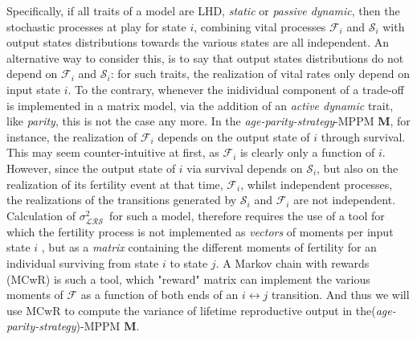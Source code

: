 \documentclass[10pt,a4paper]{article}
\newcommand{\M}{$\mathbf{M}$}
\newcommand{\PCoR}{\emph{individual} costs}
\newcommand{\vLRO}{$\sigma_{\mathrm{\mathcal{LRS}}}^2$}
\begin{document}
Specifically, if all traits of a model are LHD, \emph{static} or \emph{passive dynamic}, then the stochastic processes at play for state $i$, combining vital processes $\mathcal{F}_{i}$ and $\mathcal{S}_{i}$ with output states distributions towards the various states %
 are all independent. An alternative way to consider this, is to say that output states distributions do not depend on $\mathcal{F}_{i}$ and $\mathcal{S}_{i}$: for such traits, the realization of vital rates only depend on input state $i$.
To the contrary, whenever the inidividual component of a trade-off is implemented in a matrix model, via the addition of an \emph{active dynamic} trait, like \emph{parity}, this is not the case any more. In the \emph{age-parity-strategy}-MPPM \M, for instance, the realization of $\mathcal{F}_{i}$  depends on the output state of $i$ through survival. This may seem counter-intuitive at first, as $\mathcal{F}_{i}$ is clearly only a function of $i$. However, since the output state of $i$ via survival depends on $\mathcal{S}_{i}$, but also on the realization of its fertility event at that time, $\mathcal{F}_{i}$, whilst independent processes, the realizations of the transitions generated by $\mathcal{S}_{i}$ and $\mathcal{F}_{i}$ are not independent.\\
 
Calculation of \vLRO\ for such a model, therefore requires the use of a tool for which the fertility process is not implemented as \emph{vectors} of moments per input state $i$%
, but as a \emph{matrix} containing the different moments of fertility for an individual surviving from state $i$ to state $j$.
A Markov chain with rewards (MCwR) is such a tool, which "reward" matrix can implement the various moments of $\mathcal{F}$ as a function of both ends of an $i \leftrightarrow j$ transition.
And thus we will use MCwR to compute the variance of lifetime reproductive output in the(\emph{age-parity-strategy})-MPPM \M. \\
\end{document}
